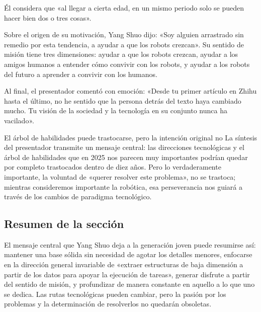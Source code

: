 Él considera que «al llegar a cierta edad, en un mismo periodo solo se pueden hacer bien dos o tres cosas».

Sobre el origen de su motivación, Yang Shuo dijo: «Soy alguien arrastrado sin remedio por esta tendencia, a ayudar a que los robots crezcan». Su sentido de misión tiene tres dimensiones: ayudar a que los robots crezcan, ayudar a los amigos humanos a entender cómo convivir con los robots, y ayudar a los robots del futuro a aprender a convivir con los humanos.

Al final, el presentador comentó con emoción: «Desde tu primer artículo en Zhihu hasta el último, no he sentido que la persona detrás del texto haya cambiado mucho. Tu visión de la sociedad y la tecnología en su conjunto nunca ha vacilado».

\begin{warningbox}{El árbol de habilidades puede trastocarse, pero la intención original no}
La síntesis del presentador transmite un mensaje central: las direcciones tecnológicas y el árbol de habilidades que en 2025 nos parecen muy importantes podrían quedar por completo trastocados dentro de diez años. Pero lo verdaderamente importante, la voluntad de «querer resolver este problema», no se trastoca; mientras consideremos importante la robótica, esa perseverancia nos guiará a través de los cambios de paradigma tecnológico.
\end{warningbox}

\subsection{Resumen de la sección}

El mensaje central que Yang Shuo deja a la generación joven puede resumirse así: mantener una base sólida sin necesidad de agotar los detalles menores, enfocarse en la dirección general invariable de «extraer estructuras de baja dimensión a partir de los datos para apoyar la ejecución de tareas», generar disfrute a partir del sentido de misión, y profundizar de manera constante en aquello a lo que uno se dedica. Las rutas tecnológicas pueden cambiar, pero la pasión por los problemas y la determinación de resolverlos no quedarán obsoletas.
